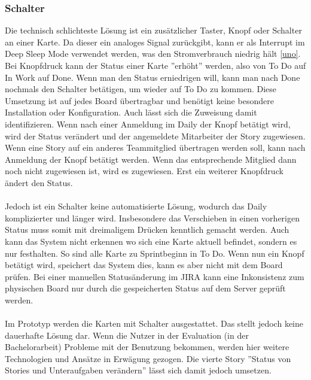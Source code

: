 \documentclass[12pt,titlepage]{scrartcl}
\begin{document}
			\subsubsection{Schalter}
			Die technisch schlichteste Lösung ist ein zusätzlicher Taster, Knopf oder Schalter an einer Karte. Da dieser ein analoges Signal zurückgibt, kann er als Interrupt im Deep Sleep Mode verwendet werden, was den Stromverbrauch niedrig hält \ref{uno}. Bei Knopfdruck kann der Status einer Karte ''erhöht'' werden, also von To Do auf In Work auf Done.  Wenn man den Status erniedrigen will, kann man nach Done nochmals den Schalter betätigen, um wieder auf To Do zu kommen. Diese Umsetzung ist auf jedes Board übertragbar und benötigt keine besondere Installation oder Konfiguration. Auch lässt sich die Zuweisung damit identifizieren. Wenn nach einer Anmeldung im Daily der Knopf betätigt wird, wird der Status verändert und der angemeldete Mitarbeiter der Story zugewiesen. Wenn eine Story auf ein anderes Teammitglied übertragen werden soll, kann nach Anmeldung der Knopf betätigt werden. Wenn das entsprechende Mitglied dann noch nicht zugewiesen ist, wird es zugewiesen. Erst ein weiterer Knopfdruck ändert den Status. \\ \\
Jedoch ist ein Schalter keine automatisierte Lösung, wodurch das Daily komplizierter und länger wird. Insbesondere das Verschieben in einen vorherigen Status muss somit mit dreimaligem Drücken kenntlich gemacht werden. Auch kann das System nicht erkennen wo sich eine Karte aktuell befindet, sondern es nur festhalten. So sind alle Karte zu Sprintbeginn in To Do. Wenn nun ein Knopf betätigt wird, speichert das System dies, kann es aber nicht mit dem Board prüfen. Bei einer manuellen Statusänderung im JIRA kann eine Inkonsistenz zum physischen Board nur durch die gespeicherten Status auf dem Server geprüft werden. \\ \\
Im Prototyp werden die Karten mit Schalter ausgestattet. Das stellt jedoch keine dauerhafte Lösung dar. Wenn die Nutzer in der Evaluation (in der Bachelorarbeit) Probleme mit der Benutzung bekommen, werden hier weitere Technologien und Ansätze in Erwägung gezogen. Die vierte Story ''Status von Stories und Unteraufgaben verändern'' lässt sich damit jedoch umsetzen.
\end{document}
